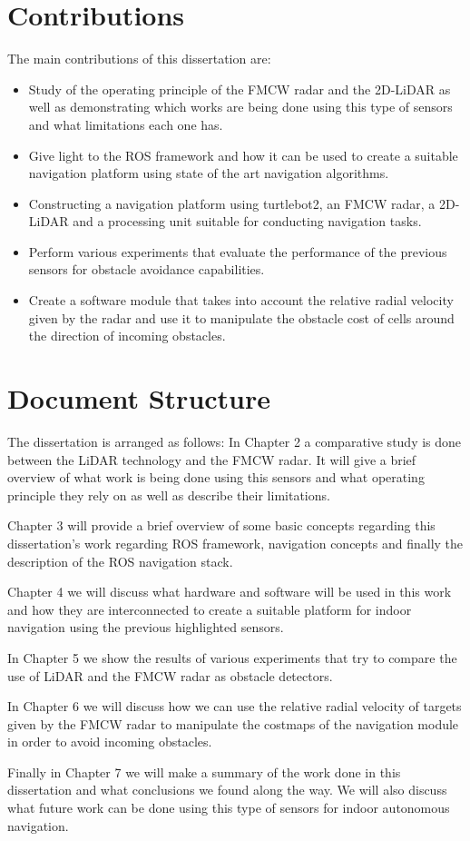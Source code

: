 \section{Contributions}
The main contributions of this dissertation are:
\begin{itemize}
    \item Study of the operating principle of the \ac{FMCW} \ac{radar} and the 2D-\ac{LiDAR} as well as demonstrating which works are being done using this type of sensors and what limitations each one has.
    \item Give light to the \ac{ROS} framework and how it can be used to create a suitable navigation platform using state of the art navigation algorithms.
    \item Constructing a navigation platform using turtlebot2, an \ac{FMCW} \ac{radar}, a 2D- \ac{LiDAR} and a processing unit suitable for conducting navigation tasks.
    \item Perform various experiments that evaluate the performance of the previous sensors for obstacle avoidance capabilities.
    \item Create a software module that takes into account the relative radial velocity given by the \ac{radar} and use it to manipulate the obstacle cost of cells around the direction of incoming obstacles.
\end{itemize}




\section{Document Structure}
The dissertation is arranged as follows:
In Chapter 2 a comparative study is done between the \ac{LiDAR} technology and the \ac{FMCW} \ac{radar}. It will give a brief overview of what work is being done using this sensors and what operating principle they rely on as well as describe their limitations.

Chapter 3 will provide a brief overview of some basic concepts regarding this dissertation's work regarding \ac{ROS} framework, navigation concepts and finally the description of the \ac{ROS} navigation stack.

Chapter 4 we will discuss what hardware and software will be used in this work and how they are interconnected to create a suitable platform for indoor navigation using the previous highlighted sensors.

In Chapter 5 we show the results of various experiments that try to compare the use of \ac{LiDAR} and the \ac{FMCW} \ac{radar} as obstacle detectors.

In Chapter 6 we will discuss how we can use the relative radial velocity of targets given by the \ac{FMCW} \ac{radar} to manipulate the costmaps of the navigation module in order to avoid incoming obstacles.

Finally in Chapter 7 we will make a summary of the work done in this dissertation and what conclusions we found along the way. We will also discuss what future work can be done using this type of sensors for indoor autonomous navigation.



